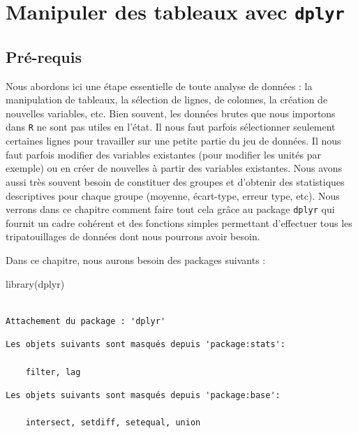 \documentclass[
  letterpaper,
  DIV=11,
  numbers=noendperiod]{scrreprt}
\newenvironment{Shaded}{\begin{snugshade}}{\end{snugshade}}
\newcommand{\FunctionTok}[1]{\textcolor[rgb]{0.28,0.35,0.67}{#1}}
\newcommand{\NormalTok}[1]{\textcolor[rgb]{0.00,0.23,0.31}{#1}}
\begin{document}

\hypertarget{sec-wrangling}{%
\chapter{\texorpdfstring{Manipuler des tableaux avec
\texttt{dplyr}}{Manipuler des tableaux avec dplyr}}\label{sec-wrangling}}

\hypertarget{pruxe9-requis}{%
\section{Pré-requis}\label{pruxe9-requis}}

Nous abordons ici une étape essentielle de toute analyse de données : la
manipulation de tableaux, la sélection de lignes, de colonnes, la
création de nouvelles variables, etc. Bien souvent, les données brutes
que nous importons dans \texttt{R} ne sont pas utiles en l'état. Il nous
faut parfois sélectionner seulement certaines lignes pour travailler sur
une petite partie du jeu de données. Il nous faut parfois modifier des
variables existantes (pour modifier les unités par exemple) ou en créer
de nouvelles à partir des variables existantes. Nous avons aussi très
souvent besoin de constituer des groupes et d'obtenir des statistiques
descriptives pour chaque groupe (moyenne, écart-type, erreur type, etc).
Nous verrons dans ce chapitre comment faire tout cela grâce au package
\texttt{dplyr} qui fournit un cadre cohérent et des fonctions simples
permettant d'effectuer tous les tripatouillages de données dont nous
pourrons avoir besoin.

Dans ce chapitre, nous aurons besoin des packages suivants :

\begin{Shaded}
\begin{Highlighting}[]
\FunctionTok{library}\NormalTok{(dplyr)}
\end{Highlighting}
\end{Shaded}

\begin{verbatim}

Attachement du package : 'dplyr'
\end{verbatim}

\begin{verbatim}
Les objets suivants sont masqués depuis 'package:stats':

    filter, lag
\end{verbatim}

\begin{verbatim}
Les objets suivants sont masqués depuis 'package:base':

    intersect, setdiff, setequal, union
\end{verbatim}
\end{document}
